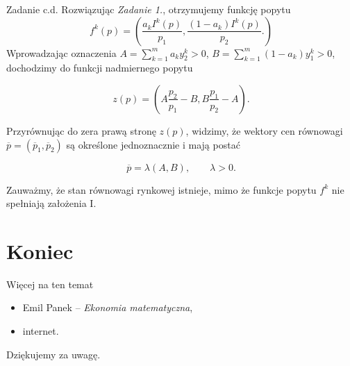 \documentclass[a4paper, 11pt]{beamer}
\begin{document}
    \begin{frame}{Zadanie c.d.}
      Rozwiązując \textit{Zadanie 1.}, otrzymujemy funkcję popytu
      \[ f^k(p) = \left( \frac{a_kI^k(p)}{p_1}, \frac{(1-a_k)I^k(p)}{p_2}.
      \right) \]
      Wprowadzając oznaczenia $A = \sum^m_{k=1} a_ky_2^k > 0$, $B= \sum^m_{k=1}
      (1-a_k)y_1^k > 0$, dochodzimy do funkcji nadmiernego popytu

      \[ z(p) = \left( A\frac{p_2}{p_1}-B, B \frac{p_1}{p_2}-A \right). \]

      Przyrównując do zera prawą stronę $z(p)$, widzimy, że wektory cen
      równowagi $\overline{p} =( \overline{p}_1, \overline{p}_2)$ są określone
      jednoznacznie i mają postać
      
      \[ \overline{p} = \lambda(A,B), \qquad \lambda > 0. \]
      \begin{block}{}
      Zauważmy, że stan równowagi rynkowej istnieje, mimo że funkcje popytu
      $f^k$ nie spełniają założenia \alert{I}.
      \end{block}
    \end{frame}

  \section*{Koniec}

    \begin{frame}{Więcej na ten temat}
      \begin{itemize}
	\item Emil Panek -- \textit{Ekonomia matematyczna},
	\item internet.
      \end{itemize}
    \end{frame}

    \begin{frame}
      \begin{center}
	Dziękujemy za uwagę.
      \end{center}
    \end{frame}
\end{document}
